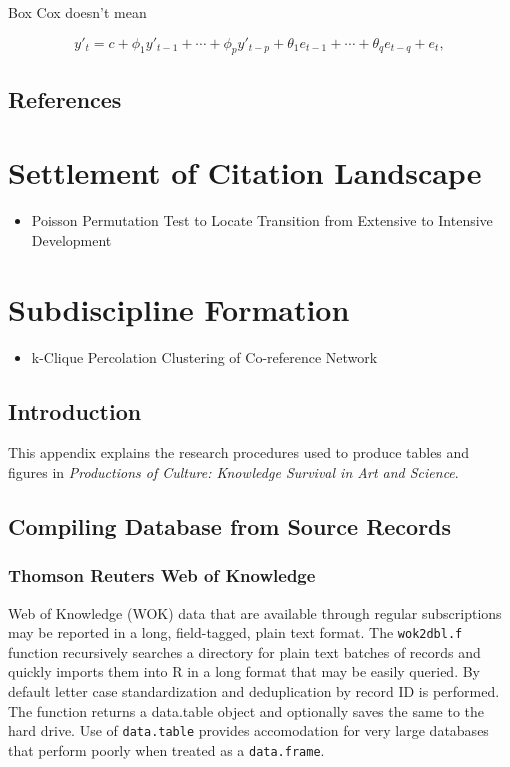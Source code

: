 \documentclass [PhD] {uclathes}
\providecommand{\tightlist}{
  \setlength{\itemsep}{0pt}\setlength{\parskip}{0pt}}
\begin{document}
Box Cox doesn't mean

\begin{equation}\tag{8.1}\label{eq-8-arima} y'_{t} = c +
\phi_{1}y'_{t-1} + \cdots + \phi_{p}y'_{t-p} +
\theta_{1}e_{t-1} + \cdots + \theta_{q}e_{t-q} + e_{t},
\end{equation}

\section{References}\label{references}
 \chapter{Settlement of Citation Landscape}
\begin{itemize}
\tightlist
\item
  Poisson Permutation Test to Locate Transition from Extensive to
  Intensive Development
\end{itemize}
 \chapter{Subdiscipline Formation}
\begin{itemize}
\tightlist
\item
  k-Clique Percolation Clustering of Co-reference Network
\end{itemize}

\section{Introduction}\label{introduction}

This appendix explains the research procedures used to produce tables
and figures in \emph{Productions of Culture: Knowledge Survival in Art
and Science}.

\section{Compiling Database from Source
Records}\label{compiling-database-from-source-records}

\subsection{Thomson Reuters Web of
Knowledge}\label{thomson-reuters-web-of-knowledge}

Web of Knowledge (WOK) data that are available through regular
subscriptions may be reported in a long, field-tagged, plain text
format. The \texttt{wok2dbl.f} function recursively searches a directory
for plain text batches of records and quickly imports them into R in a
long format that may be easily queried. By default letter case
standardization and deduplication by record ID is performed. The
function returns a data.table object and optionally saves the same to
the hard drive. Use of \texttt{data.table} provides accomodation for
very large databases that perform poorly when treated as a
\texttt{data.frame}.
\end{document}
